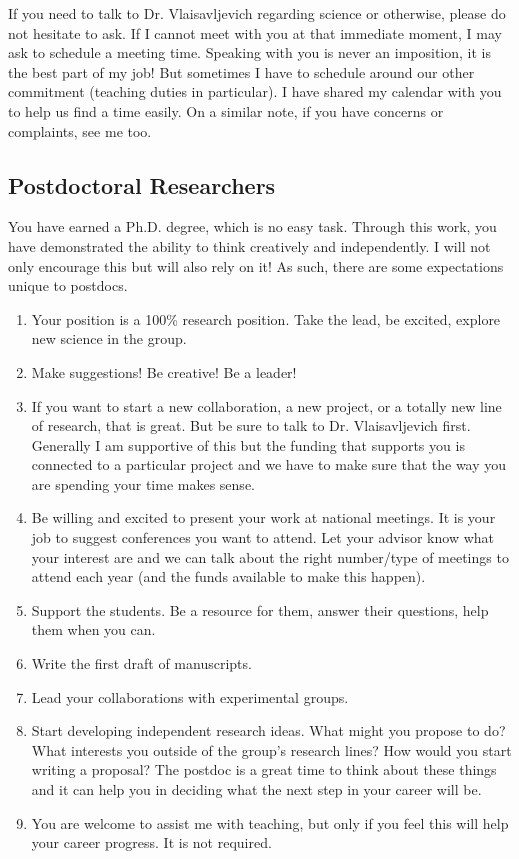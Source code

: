 \documentclass[letterpaper]{article}
\begin{document}
If you need to talk to Dr. Vlaisavljevich regarding science or otherwise, please do not hesitate to ask. If I cannot meet with you at that immediate moment, I may ask to schedule a meeting time. Speaking with you is never an imposition, it is the best part of my job! But sometimes I have to schedule around our other commitment (teaching duties in particular). I have shared my calendar with you to help us find a time easily. On a similar note, if you have concerns or complaints, see me too.

\subsection*{Postdoctoral Researchers}
You have earned a Ph.D. degree, which is no easy task. Through this work, you have demonstrated the ability to think creatively and independently. I will not only encourage this but will also rely on it! As such, there are some expectations unique to postdocs. 

\begin{enumerate} 
\item Your position is a 100\% research position. Take the lead, be excited, explore new science in the group.
\item Make suggestions! Be creative! Be a leader!
\item If you want to start a new collaboration, a new project, or a totally new line of research, that is great. But be sure to talk to Dr. Vlaisavljevich first. Generally I am supportive of this but the funding that supports you is connected to a particular project and we have to make sure that the way you are spending your time makes sense.
\item Be willing and excited to present your work at national meetings. It is your job to suggest conferences you want to attend. Let your advisor know what your interest are and we can talk about the right number/type of meetings to attend each year (and the funds available to make this happen).
\item Support the students. Be a resource for them, answer their questions, help them when you can.
\item Write the first draft of manuscripts.
\item Lead your collaborations with experimental groups.
\item Start developing independent research ideas. What might you propose to do? What interests you outside of the group's research lines? How would you start writing a proposal? The postdoc is a great time to think about these things and it can help you in deciding what the next step in your career will be. 
\item You are welcome to assist me with teaching, but only if you feel this will help your career progress. It is not required.
\end{enumerate}
\end{document}

